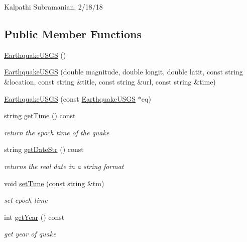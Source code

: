 Kalpathi Subramanian, 2/18/18 \subsection*{Public Member Functions}
\begin{DoxyCompactItemize}
\item 
\mbox{\hyperlink{classbridges_1_1dataset_1_1_earthquake_u_s_g_s_a2e89f6ef9b631c6b8315c696cee7fb53}{Earthquake\+U\+S\+GS}} ()
\item 
\mbox{\hyperlink{classbridges_1_1dataset_1_1_earthquake_u_s_g_s_a3bb03ca9f4c0a3c8ecbab5a90b1886f8}{Earthquake\+U\+S\+GS}} (double magnitude, double longit, double latit, const string \&location, const string \&title, const string \&url, const string \&time)
\item 
\mbox{\hyperlink{classbridges_1_1dataset_1_1_earthquake_u_s_g_s_a382c751b8c71963ebcd7f0c7f1aed30a}{Earthquake\+U\+S\+GS}} (const \mbox{\hyperlink{classbridges_1_1dataset_1_1_earthquake_u_s_g_s}{Earthquake\+U\+S\+GS}} $\ast$eq)
\item 
string \mbox{\hyperlink{classbridges_1_1dataset_1_1_earthquake_u_s_g_s_a9078bfa4e954f78a3cf6e4a87747272b}{get\+Time}} () const
\begin{DoxyCompactList}\small\item\em return the epoch time of the quake \end{DoxyCompactList}\item 
string \mbox{\hyperlink{classbridges_1_1dataset_1_1_earthquake_u_s_g_s_a6fb0ff9a4f6cee9b1c04b588fc25c3ba}{get\+Date\+Str}} () const
\begin{DoxyCompactList}\small\item\em returns the real date in a string format \end{DoxyCompactList}\item 
void \mbox{\hyperlink{classbridges_1_1dataset_1_1_earthquake_u_s_g_s_af191301bcbaa5278480a57e9aea674d7}{set\+Time}} (const string \&tm)
\begin{DoxyCompactList}\small\item\em set epoch time \end{DoxyCompactList}\item 
int \mbox{\hyperlink{classbridges_1_1dataset_1_1_earthquake_u_s_g_s_a569120c9051d8d2fd73e3c778a81b9f3}{get\+Year}} () const
\begin{DoxyCompactList}\small\item\em get year of quake \end{DoxyCompactList}\item 

\end{DoxyCompactItemize}
